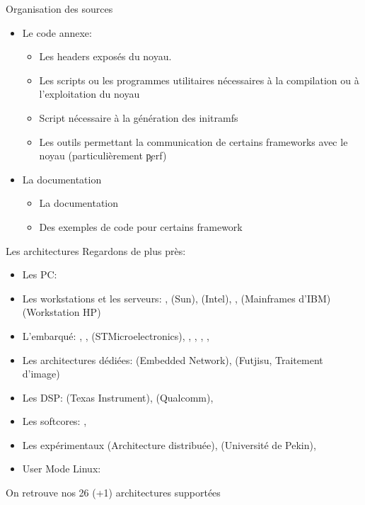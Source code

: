\begin{frame}[fragile=singleslide]{Organisation des sources}
  \begin{itemize} 
  \item Le code annexe:
    \begin{itemize} 
    \item {} Les headers exposés du noyau.
    \item  {} Les  scripts ou  les  programmes utilitaires
      nécessaires à la compilation ou à l'exploitation du noyau
    \item {} Script nécessaire à la génération des initramfs
    \item  {}  Les  outils  permettant la  communication  de
      certains frameworks avec le noyau (particulièrement \c{perf})
    \end{itemize} 
  \item La documentation
    \begin{itemize} 
    \item {} La documentation
    \item {} Des exemples de code pour certains framework
    \end{itemize} 
  \end{itemize} 
\end{frame} 

\begin{frame}[fragile=singleslide]{Les architectures}
  Regardons  de plus près:
  \begin{itemize} 
  \item Les PC: 
  \item Les  workstations et les  serveurs: , 
    (Sun),        (Intel),   ,    
    (Mainframes d'IBM)  (Workstation HP)
  \item     L'embarqué:     ,     ,     
    (STMicroelectronics),   ,  ,  ,
    ,  
  \item  Les architectures  dédiées:   (Embedded  Network),
     (Futjisu, Traitement d'image)
  \item  Les   DSP:    (Texas   Instrument),  
    (Qualcomm), 
  \item Les softcores: , 
  \item  Les   expérimentaux    (Architecture  distribuée),
     (Université de Pekin), 
  \item User Mode Linux: 
  \end{itemize} 
  On retrouve nos 26 (+1) architectures supportées
\end{frame}    

